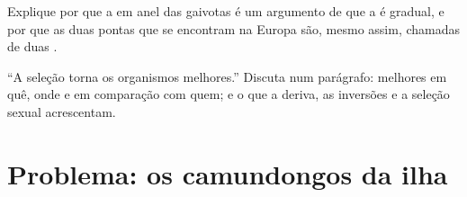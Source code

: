 \begin{exercise}[$\star\star\star$]\label{exo:g12:selection-drift-speciation:14}
Explique por que a  em anel das gaivotas é um argumento de que a
 é gradual, e por que as duas pontas que se encontram na
Europa são, mesmo assim, chamadas de duas .
\end{exercise}

\begin{exercise}[$\star\star\star$]\label{exo:g12:selection-drift-speciation:15}
``A seleção torna os organismos melhores.'' Discuta num parágrafo:
melhores em quê, onde e em comparação com quem; e o que a deriva, as
inversões e a seleção sexual acrescentam.
\end{exercise}

\section{Problema: os camundongos da ilha}

